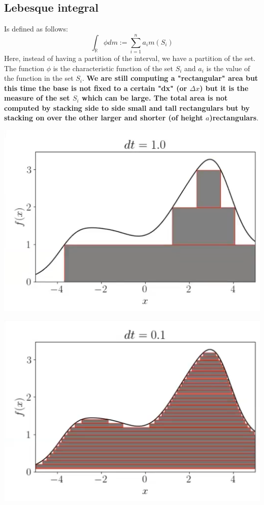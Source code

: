 \subsection*{Lebesque integral}
Is defined as follows: 
\[
    \int_{\mathbb{R}}\phi dm := \sum_{i=1}^{n} a_i m(S_i)    
\]
Here, instead of having a partition of the interval, we have a partition of the set. The function $\phi$ is the characteristic function of the set $S_i$ and $a_i$ is the value of the function in the set $S_i$. \textbf{We are still computing a "rectangular" area but this time the base is not fixed to a certain "dx" (or $\Delta x$) but it is the measure of the set $S_i$ which can be large. The total area is not computed by stacking side to side small and tall rectangulars but by stacking on over the other larger and shorter (of height $a$)rectangulars}.\\
\begin{multicols}{2}
    \begin{center}
        \includegraphics[scale = 0.4]{../images/LebesgueIntegral.png}
    \end{center}
    \begin{center}
        \includegraphics[scale = 0.4]{../images/LebesgueThinner.png}
    \end{center}
\end{multicols}
